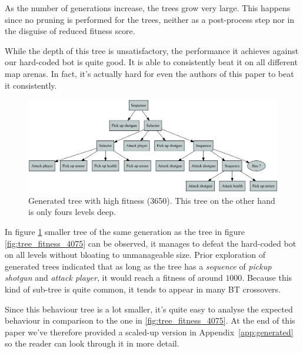 \documentclass[a4paper, twocolumn]{article}
\begin{document}
        As the number of generations increase, the trees grow very large. This happens since no pruning is performed for the trees, neither as a post-process step nor in the disguise of reduced fitness score.

        While the depth of this tree is unsatisfactory, the performance it achieves against our hard-coded bot is quite good. It is able to consistently beat it on all different map arenas. In fact, it's actually hard for even the authors of this paper to beat it consistently.

        \begin{figure}[H]
            \centering
            \includegraphics[width=\linewidth]{share/tree-fitness-3780.png}
            \caption{Generated tree with high fitness (3650). This tree on the other hand is only fours levels deep.}
            \label{fig:tree_fitness_3650}
        \end{figure}
        In figure \ref{fig:tree_fitness_3650} smaller tree of the same generation as the tree in figure \ref{fig:tree_fitness_4075} can be observed, it manages to defeat the hard-coded bot on all levels without bloating to unmanageable size. Prior exploration of generated trees indicated that as long as the tree has a \textit{sequence} of \textit{pickup shotgun} and \textit{attack player}, it would reach a fitness of around \(1000\). Because this kind of sub-tree is quite common, it tends to appear in many BT crossovers.

        Since this behaviour tree is a lot smaller, it's quite easy to analyse the expected behaviour in comparison to the one in \cref{fig:tree_fitness_4075}. At the end of this paper we've therefore provided a scaled-up version in Appendix~\ref{app:generated} so the reader can look through it in more detail.
\end{document}
